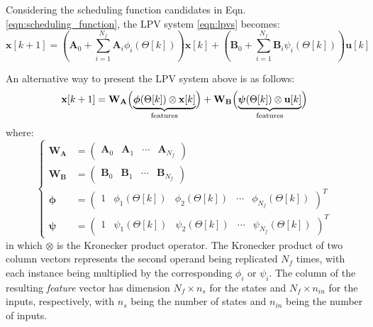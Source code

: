 Considering the scheduling function candidates in Eqn. \eqref{eqn:scheduling_function}, the LPV system \eqref{eqn:lpvs} becomes:
\begin{equation} \label{eqn:full_lpv}
        \mathbf{x}[k+1] = \left(\mathbf{A}_0 + \sum_{i=1}^{N_f}\mathbf{A}_i\phi_i(\Theta[k])\right)\mathbf{x}[k] + \left(\mathbf{B}_0 + \sum_{i=1}^{N_f}\mathbf{B}_i\psi_i(\Theta[k])\right)\mathbf{u}[k] 
\end{equation}

An alternative way to present the LPV system above is as follows:
\begin{equation} \label{eq:LPV:Kronecker}
 \mathbf{x}[k+1] = \mathbf{W_A}\Bigl (\underbrace{\boldsymbol{\phi}(\Theta[k]) \otimes \mathbf{x}[k]}_{\text{features}}\Bigr)    
   + \mathbf{W_B}\Bigl (\underbrace{\boldsymbol{\psi}(\Theta[k]) \otimes \mathbf{u}[k]}_{\text{features}}\Bigr )
 \end{equation}
 where:
\begin{equation} \label{eq:LPV:Kronecker:matrices}
\left \{
\begin{aligned}
 \mathbf{W_A} &=
 \begin{pmatrix}
     \mathbf{A}_0 & \mathbf{A}_1 & \cdots & \mathbf{A}_{N_f}
 \end{pmatrix}\\
 \mathbf{W_B} &= \begin{pmatrix}
     \mathbf{B}_0 & \mathbf{B}_1 & \cdots & \mathbf{B}_{N_f}
 \end{pmatrix} \\
 \boldsymbol{\phi} &=
 \begin{pmatrix}
     1 & \phi_1(\Theta[k]) & \phi_2(\Theta[k]) & \cdots & \phi_{N_f}(\Theta[k])
 \end{pmatrix}^T \\
 \boldsymbol{\psi} &=
 \begin{pmatrix}
     1 & \psi_1(\Theta[k]) & \psi_2(\Theta[k]) & \cdots & \psi_{N_f}(\Theta[k])
 \end{pmatrix}^T
    \end{aligned}
        \right .
\end{equation}
in which $\otimes$ is the Kronecker product operator.
%
The Kronecker product of two column vectors represents the second operand being replicated $N_f$ times, with each instance being multiplied by the corresponding $\phi_i$ or $\psi_i$.
%
The column of the resulting \textit{feature} vector has dimension $N_f \times n_s$ for the states and $N_f \times n_{in}$ for the inputs, respectively, with $n_s$ being the number of states and $n_{in}$ being the number of inputs. 

